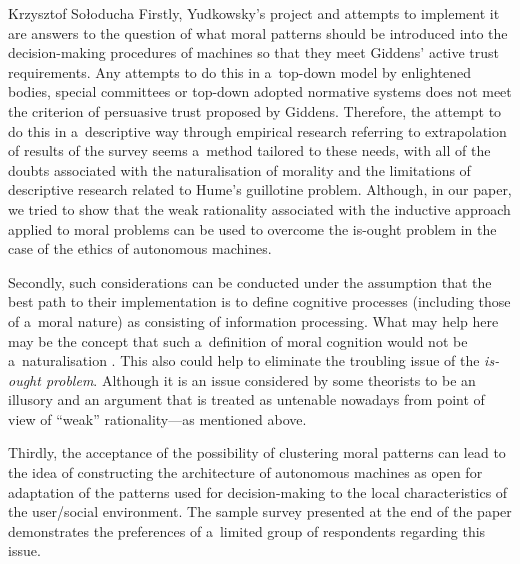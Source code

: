 \begin{artengenv}{Krzysztof Sołoducha}
Firstly, Yudkowsky's project and attempts to implement it are answers to the question of what moral patterns should be introduced into the decision-making procedures of machines so that they meet Giddens' active trust requirements. Any attempts to do this in a~top-down model by enlightened bodies, special committees or top-down adopted normative systems does not meet the criterion of persuasive trust proposed by Giddens. Therefore, the attempt to do this in a~descriptive way through empirical research referring to extrapolation of results of the survey seems a~method tailored to these needs, with all of the doubts associated with the naturalisation of morality and the limitations of descriptive research related to Hume's guillotine problem. Although, in our paper, we tried to show that the weak rationality associated with the inductive approach applied to moral problems can be used to overcome the is-ought problem in the case of the ethics of autonomous machines.

Secondly, such considerations can be conducted under the assumption that the best path to their implementation is to define cognitive processes (including those of a~moral nature) as consisting of information processing. What may help here may be the concept that such a~definition of moral cognition would not be a~naturalisation
\parencite[][]{peruzzi_beginners_2015}. %
 This also could help to eliminate the troubling issue of the \textit{is-ought problem}. Although it is an issue considered by some theorists to be an illusory 
\parencite[][]{gellner_words_2005} %
 and an argument that is treated as untenable nowadays 
\parencite[][]{searle_how_1964} %
 from point of view of ``weak'' rationality—as mentioned above.

Thirdly, the acceptance of the possibility of clustering moral patterns can lead to the idea of constructing the architecture of autonomous machines as open for adaptation of the patterns used for decision-making to the local characteristics of the user/social environment. The sample survey presented at the end of the paper demonstrates the preferences of a~limited group of respondents regarding this issue.


\end{artengenv}
